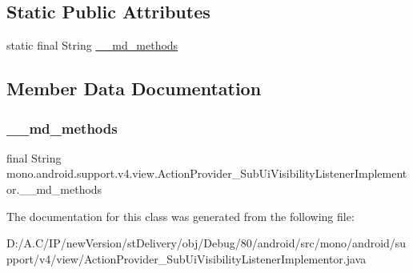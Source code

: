 \subsection*{Static Public Attributes}
\begin{DoxyCompactItemize}
\item 
static final String \hyperlink{classmono_1_1android_1_1support_1_1v4_1_1view_1_1_action_provider___sub_ui_visibility_listener_implementor_a80f46f5139a7d5baf9a0c701c053b68d}{\+\_\+\+\_\+md\+\_\+methods}
\end{DoxyCompactItemize}


\subsection{Member Data Documentation}
\mbox{\label{classmono_1_1android_1_1support_1_1v4_1_1view_1_1_action_provider___sub_ui_visibility_listener_implementor_a80f46f5139a7d5baf9a0c701c053b68d}} 
\subsubsection{\texorpdfstring{\+\_\+\+\_\+md\+\_\+methods}{\_\_md\_methods}}
{\footnotesize\ttfamily final String mono.\+android.\+support.\+v4.\+view.\+Action\+Provider\+\_\+\+Sub\+Ui\+Visibility\+Listener\+Implementor.\+\_\+\+\_\+md\+\_\+methods\hspace{0.3cm}{\ttfamily [static]}}



The documentation for this class was generated from the following file\+:\begin{DoxyCompactItemize}
\item 
D\+:/\+A.\+C/\+I\+P/new\+Version/st\+Delivery/obj/\+Debug/80/android/src/mono/android/support/v4/view/Action\+Provider\+\_\+\+Sub\+Ui\+Visibility\+Listener\+Implementor.\+java\end{DoxyCompactItemize}
